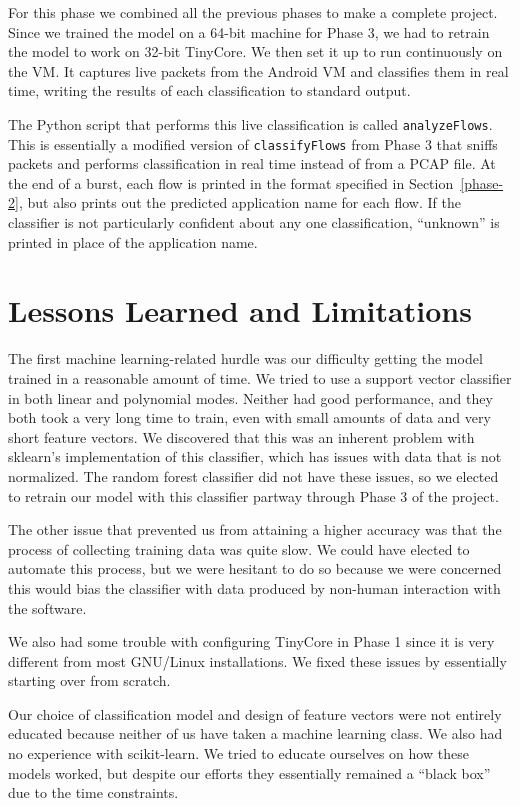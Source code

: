 \documentclass[a4paper, 11pt]{article} %
\begin{document}
For this phase we combined all the previous phases to make a complete project.
Since we trained the model on a 64-bit machine for Phase 3, we had to retrain
the model to work on 32-bit TinyCore. We then set it up to run continuously on
the VM. It captures live packets from the Android VM and classifies them in real
time, writing the results of each classification to standard output.

The Python script that performs this live classification is called
\texttt{analyzeFlows}. This is essentially a modified version of
\texttt{classifyFlows} from Phase 3 that sniffs packets and performs
classification in real time instead of from a PCAP file. At the end of a burst,
each flow is printed in the format specified in Section~\ref{phase-2}, but also
prints out the predicted application name for each flow. If the classifier is
not particularly confident about any one classification, ``unknown'' is printed
in place of the application name.

\section{Lessons Learned and Limitations}

The first machine learning-related hurdle was our difficulty getting the model
trained in a reasonable amount of time. We tried to use a support vector
classifier in both linear and polynomial modes. Neither had good performance,
and they both took a very long time to train, even with small amounts of data
and very short feature vectors. We discovered that this was an inherent problem
with sklearn's implementation of this classifier, which has issues with data
that is not normalized. The random forest classifier did not have these issues,
so we elected to retrain our model with this classifier partway through Phase 3
of the project.

The other issue that prevented us from attaining a higher accuracy was that the
process of collecting training data was quite slow. We could have elected to
automate this process, but we were hesitant to do so because we were concerned
this would bias the classifier with data produced by non-human interaction with
the software.

We also had some trouble with configuring TinyCore in Phase 1 since it is very
different from most GNU/Linux installations. We fixed these issues by
essentially starting over from scratch.

Our choice of classification model and design of feature vectors were not
entirely educated because neither of us have taken a machine learning class. We
also had no experience with scikit-learn. We tried to educate ourselves on how
these models worked, but despite our efforts they essentially remained a ``black
box'' due to the time constraints.
\end{document}
